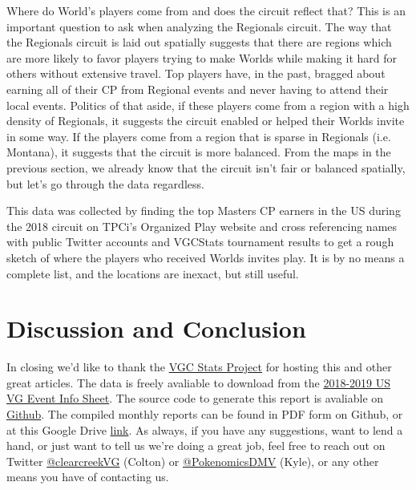 \documentclass[11pt,twocolumn]{article}
\begin{document}
Where do World's players come from and does the circuit reflect that? This is an important question to ask when analyzing the Regionals circuit. The way that the Regionals circuit is laid out spatially suggests that there are regions which are more likely to favor players trying to make Worlds while making it hard for others without extensive travel. Top players have, in the past, bragged about earning all of their CP from Regional events and never having to attend their local events. Politics of that aside, if these players come from a region with a high density of Regionals, it suggests the circuit enabled or helped their Worlds invite in some way. If the players come from a region that is sparse in Regionals (i.e. Montana), it suggests that the circuit is more balanced. From the maps in the previous section, we already know that the circuit isn't fair or balanced spatially, but let's go through the data regardless.

This data was collected by finding the top Masters CP earners in the US during the 2018 circuit on TPCi's Organized Play website and cross referencing names with public Twitter accounts and VGCStats tournament results to get a rough sketch of where the players who received Worlds invites play. It is by no means a complete list, and the locations are inexact, but still useful. 

\section*{Discussion and Conclusion}



In closing we'd like to thank the \href{vgcstats.com}{VGC Stats Project} for hosting this and other great articles. The data is freely avaliable to download from the \href{https://docs.google.com/spreadsheets/d/1ma2g3MTRTx3fUCun9awvshfAFoD9gRbB7rpf7qXve-k/edit?usp=sharing}{2018-2019 US VG Event Info Sheet}. The source code to generate this report is avaliable on \href{https://github.com/ckohnke/pkmheatmap}{Github}. The compiled monthly reports can be found in PDF form on Github, or at this Google Drive \href{https://drive.google.com/drive/folders/1hMER-3G8YYeeNijA68x8WsmD1cQDyu9X?usp=sharing}{link}. As always, if you have any suggestions, want to lend a hand, or just want to tell us we're doing a great job, feel free to reach out on Twitter \href{https://twitter.com/clearcreekVG}{@clearcreekVG} (Colton) or \href{https://twitter.com/PokenomicsDMV}{@PokenomicsDMV} (Kyle), or any other means you have of contacting us. 
\end{document}
